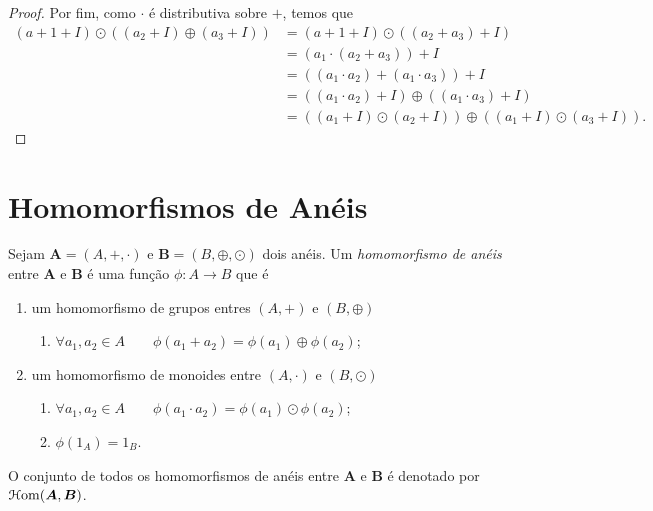 \begin{proof}
	Por fim, como $\cdot$ é distributiva sobre $+$, temos que
	\begin{align*}
	(a+1+I)\odot((a_2+I)\oplus(a_3+I)) &= (a+1+I)\odot((a_2+a_3)+I) \\
		&= (a_1 \cdot (a_2+a_3))+I \\
		&= ((a_1 \cdot a_2) + (a_1 \cdot a_3))+I \\
		&= ((a_1 \cdot a_2)+I) \oplus ((a_1 \cdot a_3)+I) \\
		&= ((a_1+I)\odot(a_2+I))\oplus((a_1+I)\odot(a_3+I)).
	\end{align*}
\end{proof}

\section{Homomorfismos de Anéis}

\begin{defi}
	Sejam $\bm A=(A,+,\cdot)$ e $\bm B=(B,\oplus,\odot)$ dois anéis. Um \emph{homomorfismo de anéis} entre $\bm A$ e $\bm B$ é uma função $\phi: A \to B$ que é
	\begin{enumerate}
	\item um homomorfismo de grupos entres $(A,+)$ e $(B,\oplus)$
		\begin{enumerate}
		\item $\forall a_1,a_2 \in A \qquad \phi(a_1 + a_2) = \phi(a_1) \oplus \phi(a_2)$;
		\end{enumerate}
	\item um homomorfismo de monoides entre $(A,\cdot)$ e $(B,\odot)$
		\begin{enumerate}
		\item $\forall a_1,a_2 \in A \qquad \phi(a_1 \cdot a_2) = \phi(a_1) \odot \phi(a_2)$;
		\item $\phi(1_A)=1_B$.
		\end{enumerate}
	\end{enumerate}

	O conjunto de todos os homomorfismos de anéis entre $\bm A$ e $\bm B$ é denotado por $\mathcal{H}\mathrm{om}(\bm A,\bm B)$.
\end{defi}

